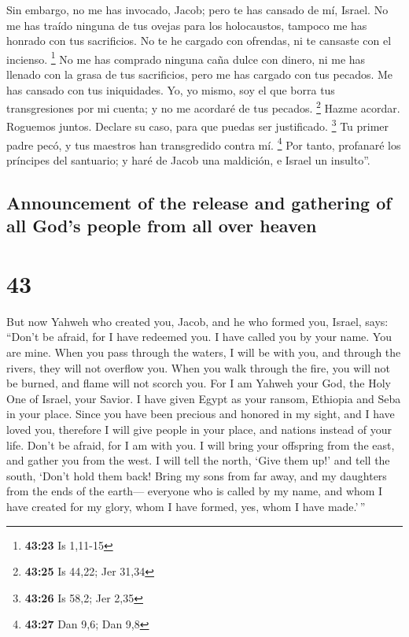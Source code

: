 \begin{paracol}{2}
 Sin embargo, no me has invocado, Jacob; pero te has
cansado de mí, Israel.  No me has traído ninguna de tus
ovejas para los holocaustos, tampoco me has honrado con tus sacrificios.
No te he cargado con ofrendas, ni te cansaste con el incienso.
\footnote{\textbf{43:23} Is 1,11-15}  No me has comprado
ninguna caña dulce con dinero, ni me has llenado con la grasa de tus
sacrificios, pero me has cargado con tus pecados. Me has cansado con tus
iniquidades.  Yo, yo mismo, soy el que borra tus
transgresiones por mi cuenta; y no me acordaré de tus pecados.
\footnote{\textbf{43:25} Is 44,22; Jer 31,34}  Hazme
acordar. Roguemos juntos. Declare su caso, para que puedas ser
justificado. \footnote{\textbf{43:26} Is 58,2; Jer 2,35} 
Tu primer padre pecó, y tus maestros han transgredido contra mí.
\footnote{\textbf{43:27} Dan 9,6; Dan 9,8}  Por tanto,
profanaré los príncipes del santuario; y haré de Jacob una maldición, e
Israel un insulto''.

\switchcolumn
\begin{otherlanguage}{english}

\hypertarget{announcement-of-the-release-and-gathering-of-all-gods-people-from-all-over-heaven}{%
\subsection{Announcement of the release and gathering of all God's
people from all over
heaven}\label{announcement-of-the-release-and-gathering-of-all-gods-people-from-all-over-heaven}}

\hypertarget{section-85}{%
\section{43}\label{section-85}}

 But now Yahweh who created you, Jacob, and he who formed
you, Israel, says: ``Don't be afraid, for I have redeemed you. I have
called you by your name. You are mine.  When you pass
through the waters, I will be with you, and through the rivers, they
will not overflow you. When you walk through the fire, you will not be
burned, and flame will not scorch you.  For I am Yahweh
your God, the Holy One of Israel, your Savior. I have given Egypt as
your ransom, Ethiopia and Seba in your place.  Since you
have been precious and honored in my sight, and I have loved you,
therefore I will give people in your place, and nations instead of your
life.  Don't be afraid, for I am with you. I will bring
your offspring from the east, and gather you from the west.
 I will tell the north, `Give them up!' and tell the
south, `Don't hold them back! Bring my sons from far away, and my
daughters from the ends of the earth---  everyone who is
called by my name, and whom I have created for my glory, whom I have
formed, yes, whom I have made.'\,''


\end{otherlanguage}
\end{paracol}

